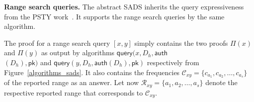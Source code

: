 {\bf Range search queries.}
The abstract SADS inherits the query expressiveness from the PSTY work~\cite{DBLP:conf/eurocrypt/PapamanthouSTY13}. It supports the range search queries by the same algorithm.

 The proof for a range search query $[x,y]$ simply contains the two proofs $\Pi(x)$ and $\Pi(y)$ as output by algorithms $\mathsf{query}(x,D_h,\mathsf{auth}$\\
 $(D_h),\mathsf{pk})$ and $\mathsf{query}(y,D_h,\mathsf{auth}(D_h),\mathsf{pk})$ respectively from Figure~\ref{algorithms_sads}. It also contains the frequencies $\mathcal{C}_{xy}=\{c_{a_1},c_{a_2},\ldots,c_{a_s}\}$ of the reported range as an answer. Let now $\mathcal{R}_{xy}=\{a_1,a_2,\ldots,a_s\}$ denote the respective reported range that corresponds to $\mathcal{C}_{xy}$.


